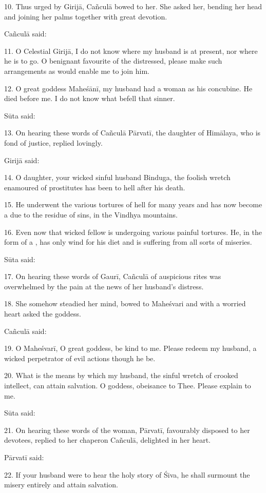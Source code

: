 10. Thus urged by Girijā, Cañculā bowed to her. She asked her, bending her head
and joining her palms together with great devotion.

Cañculā said:

11. O Celestial Girijā, I do not know where my husband is at present, nor where
he is to go. O benignant favourite of the distressed, please make such
arrangements as would enable me to join him.

12. O great goddess Maheśānī, my husband had a  woman as his concubine.
He died before me. I do not know what befell that sinner.

Sūta said:

13. On hearing these words of Cañculā Pārvatī, the daughter of Himālaya, who is
fond of justice, replied lovingly.

Girijā said:

14. O daughter, your wicked sinful husband Binduga, the foolish wretch enamoured
of prostitutes has been to hell after his death.

15. He underwent the various tortures of hell for many years and has now become
a  due to the residue of sins, in the Vindhya mountains.

16. Even now that wicked fellow is undergoing various painful tortures. He, in
the form of a , has only wind for his diet and is suffering from all
sorts of miseries.

Sūta said:

17. On hearing these words of Gaurī, Cañculā of auspicious rites was overwhelmed
by the pain at the news of her husband’s distress.

18. She somehow steadied her mind, bowed to Maheśvari and with a worried heart
asked the goddess.

Cañculā said:

19. O Maheśvarī, O great goddess, be kind to me. Please redeem my husband,
a wicked perpetrator of evil actions though he be.

20. What is the means by which my husband, the sinful wretch of crooked
intellect, can attain salvation. O goddess, obeisance to Thee. Please explain
to me.

Sūta said:

21. On hearing these words of the woman, Pārvatī, favourably disposed to her
devotees, replied to her chaperon Cañculā, delighted in her heart.

Pārvatī said:

22. If your husband were to hear the holy story of Śiva, he shall surmount
the misery entirely and attain salvation.


